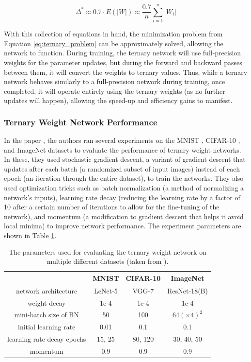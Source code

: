 \documentclass[11pt,a4paper,oldfontcommands]{memoir}
\begin{document}
\begin{equation}
\Delta^* \approx 0.7 \cdot E(|W|) \approx \frac{0.7}{n}\sum\limits_{i=1}^n |W_i|
\label{eq:ternary_delta_final}
\end{equation}

With this collection of equations in hand, the minimization problem from Equation \ref{eq:ternary_problem} can be approximately solved, allowing the network to function. During training, the ternary network will use full-precision weights for the parameter updates, but during the forward and backward passes between them, it will convert the weights to ternary values. Thus, while a ternary network behaves similarly to a full-precision network during training, once completed, it will operate entirely using the ternary weights (as no further updates will happen), allowing the speed-up and efficiency gains to manifest.

\subsubsection{Ternary Weight Network Performance}
In the paper \cite{ternary}, the authors ran several experiments on the MNIST \cite{mnist}, CIFAR-10 \cite{cifar}, and ImageNet \cite{imagenet} datasets to evaluate the performance of ternary weight networks. In these, they used stochastic gradient descent, a variant of gradient descent that updates after each batch (a randomized subset of input images) instead of each epoch (an iteration through the entire dataset), to train the networks. They also used optimization tricks such as batch normalization \cite{batch_norm} (a method of normalizing a network's inputs), learning rate decay (reducing the learning rate by a factor of 10 after a certain number of iterations to allow for the fine-tuning of the network), and momentum (a modification to gradient descent that helps it avoid local minima) to improve network performance. The experiment parameters are shown in Table \ref{tab:ternary_param}.

\begin{table}
\centering
    \begin{tabular}{c c c c} 
        \hline
         & MNIST & CIFAR-10 & ImageNet \\ 
        \hline
        network architecture & LeNet-5 & VGG-7 & ResNet-18(B) \\
        weight decay & 1e-4 & 1e-4 & 1e-4 \\
        mini-batch size of BN & 50 & 100 & 64$(\times 4)^2$ \\
        initial learning rate & 0.01 & 0.1 & 0.1 \\
        learning rate decay epochs & 15, 25 & 80, 120 & 30, 40, 50 \\
        momentum & 0.9 & 0.9 & 0.9 \\
        \hline

    \end{tabular}
\caption{The parameters used for evaluating the ternary weight network on multiple different datasets (taken from \cite{ternary}).}
\label{tab:ternary_param}
\end{table}
\end{document}
